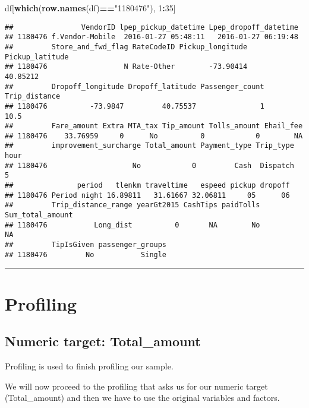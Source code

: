 \documentclass[
  18pt,
  a4paper]{article}
\newenvironment{Shaded}{\begin{snugshade}}{\end{snugshade}}
\newcommand{\DecValTok}[1]{\textcolor[rgb]{0.00,0.00,0.81}{#1}}
\newcommand{\KeywordTok}[1]{\textcolor[rgb]{0.13,0.29,0.53}{\textbf{#1}}}
\newcommand{\NormalTok}[1]{#1}
\newcommand{\OperatorTok}[1]{\textcolor[rgb]{0.81,0.36,0.00}{\textbf{#1}}}
\newcommand{\StringTok}[1]{\textcolor[rgb]{0.31,0.60,0.02}{#1}}
\begin{document}
\begin{Shaded}
\begin{Highlighting}[]
\NormalTok{df[}\KeywordTok{which}\NormalTok{(}\KeywordTok{row.names}\NormalTok{(df)}\OperatorTok{==}\StringTok{"1180476"}\NormalTok{), }\DecValTok{1}\OperatorTok{:}\DecValTok{35}\NormalTok{]}
\end{Highlighting}
\end{Shaded}

\begin{verbatim}
##                VendorID lpep_pickup_datetime Lpep_dropoff_datetime
## 1180476 f.Vendor-Mobile  2016-01-27 05:48:11   2016-01-27 06:19:48
##         Store_and_fwd_flag RateCodeID Pickup_longitude Pickup_latitude
## 1180476                  N Rate-Other        -73.90414        40.85212
##         Dropoff_longitude Dropoff_latitude Passenger_count Trip_distance
## 1180476          -73.9847         40.75537               1          10.5
##         Fare_amount Extra MTA_tax Tip_amount Tolls_amount Ehail_fee
## 1180476    33.76959     0      No          0            0        NA
##         improvement_surcharge Total_amount Payment_type Trip_type hour
## 1180476                    No            0         Cash  Dispatch    5
##               period   tlenkm traveltime   espeed pickup dropoff
## 1180476 Period night 16.89811   31.61667 32.06811     05      06
##         Trip_distance_range yearGt2015 CashTips paidTolls Sum_total_amount
## 1180476           Long_dist          0       NA        No               NA
##         TipIsGiven passenger_groups
## 1180476         No           Single
\end{verbatim}

\begin{center}\rule{0.5\linewidth}{0.5pt}\end{center}

\hypertarget{profiling}{%
\section{Profiling}\label{profiling}}

\hypertarget{numeric-target-total_amount}{%
\subsection{Numeric target:
Total\_amount}\label{numeric-target-total_amount}}

Profiling is used to finish profiling our sample.

We will now proceed to the profiling that asks us for our numeric target
(Total\_amount) and then we have to use the original variables and
factors.
\end{document}
